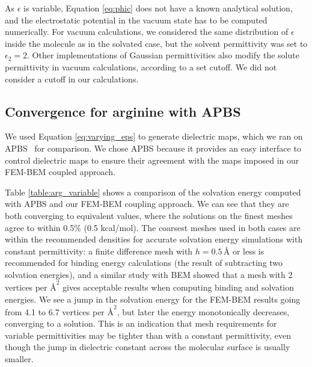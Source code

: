 As $\epsilon$ is variable, Equation \eqref{eq:phic} does not have a known analytical solution, and the electrostatic potential in the vacuum state has to be computed numerically.
For vacuum calculations, we considered the same distribution of $\epsilon$ inside the molecule as in the solvated case, but the solvent permittivity was set to $\epsilon_2=2$. 
Other implementations of Gaussian permittivities also modify the solute permittivity in vacuum calculations, according to a set cutoff.\cite{li2013dielectric} We did not consider a cutoff in our calculations.



\subsection*{\sffamily \large Convergence for arginine with APBS}

We used Equation \eqref{eq:varying_eps} to generate dielectric maps, which we ran on APBS~\cite{BakerETal2001} for comparison. 
We chose APBS because it provides an easy interface to control dielectric maps to ensure their agreement with the maps imposed in our FEM-BEM coupled approach.

Table \ref{table:arg_variable} shows a comparison of the solvation energy computed with APBS and our FEM-BEM coupling approach. We can see that they are both converging to equivalent values, where the solutions on the finest meshes agree to within 0.5\% (0.5 kcal/mol). The coarsest meshes used in both cases are within the recommended densities for accurate solvation energy simulations with constant permittivity: a finite difference mesh with $h=0.5\,\text{\AA}$ or less is recommended for binding energy calculations\cite{sorensen2015comprehensive} (the result of subtracting two solvation energies), and a similar study with BEM\cite{CooperBardhanBarba2014} showed that a mesh with 2 vertices per $\text{\AA}^2$ gives acceptable results when computing binding and solvation energies. We see a jump in the solvation energy for the FEM-BEM results going from 4.1 to 6.7 vertices per $\text{\AA}^2$, but later the energy monotonically decreases, converging to a solution. This is an indication that mesh requirements for variable permittivities may be tighter than with a constant permittivity, even though the jump in dielectric constant across the molecular surface is usually smaller. 

